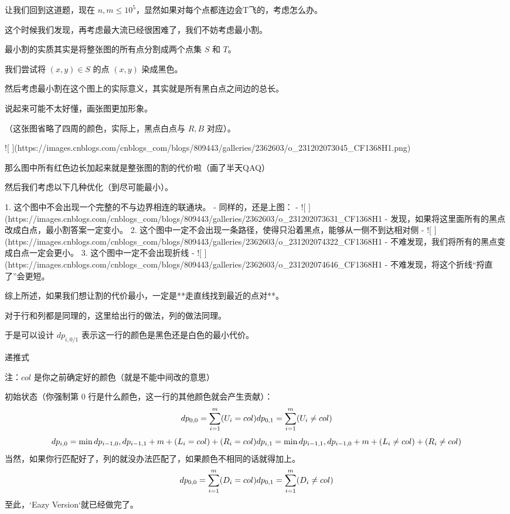 \documentclass[a4paper,12pt]{article}
\begin{document}
让我们回到这道题，现在 $n,m\le10^5$，显然如果对每个点都连边会T飞的，考虑怎么办。

这个时候我们发现，再考虑最大流已经很困难了，我们不妨考虑最小割。

最小割的实质其实是将整张图的所有点分割成两个点集 $S$ 和 $T$。

我们尝试将 $(x,y)\in S$ 的点 $(x,y)$ 染成黑色。

然后考虑最小割在这个图上的实际意义，其实就是所有黑白点之间边的总长。

说起来可能不太好懂，画张图更加形象。

（这张图省略了四周的颜色，实际上，黑点白点与 $R,B$ 对应）。

![ ](https://images.cnblogs.com/cnblogs_com/blogs/809443/galleries/2362603/o_231202073045_CF1368H1.png)

那么图中所有红色边长加起来就是整张图的割的代价啦（画了半天QAQ）

然后我们考虑以下几种优化（到尽可能最小）。

1. 这个图中不会出现一个完整的不与边界相连的联通块。
   - 同样的，还是上图：
   - ![ ](https://images.cnblogs.com/cnblogs_com/blogs/809443/galleries/2362603/o_231202073631_CF1368H1%
   - 发现，如果将这里面所有的黑点改成白点，最小割答案一定变小。
2. 这个图中一定不会出现一条路径，使得只沿着黑点，能够从一侧不到达相对侧
   - ![ ](https://images.cnblogs.com/cnblogs_com/blogs/809443/galleries/2362603/o_231202074322_CF1368H1%
   - 不难发现，我们将所有的黑点变成白点一定会更小。
3. 这个图中一定不会出现折线
   - ![ ](https://images.cnblogs.com/cnblogs_com/blogs/809443/galleries/2362603/o_231202074646_CF1368H1%
   - 不难发现，将这个折线“捋直了”会更短。

综上所述，如果我们想让割的代价最小，一定是**走直线找到最近的点对**。

对于行和列都是同理的，这里给出行的做法，列的做法同理。

于是可以设计 $dp_{i,0/1}$ 表示这一行的颜色是黑色还是白色的最小代价。

递推式

注：$col$ 是你之前确定好的颜色（就是不能中间改的意思）

初始状态（你强制第 $0$ 行是什么颜色，这一行的其他颜色就会产生贡献）：
$$
dp_{0,0}=\sum_{i=1}^m(U_{i}=col)\\
dp_{0,1}=\sum_{i=1}^m(U_{i}\neq col)
$$
$$
dp_{i,0}=\min{dp_{i-1,0},dp_{i-1,1}+m}+(L_i=col)+(R_i=col)\\
dp_{i,1}=\min{dp_{i-1,1},dp_{i-1,0}+m}+(L_i\neq col)+(R_i\neq col)
$$
当然，如果你行匹配好了，列的就没办法匹配了，如果颜色不相同的话就得加上。
$$
dp_{0,0}=\sum_{i=1}^m(D_{i}=col)\\
dp_{0,1}=\sum_{i=1}^m(D_{i}\neq col)
$$
至此，`Eazy Version`就已经做完了。
\end{document}
